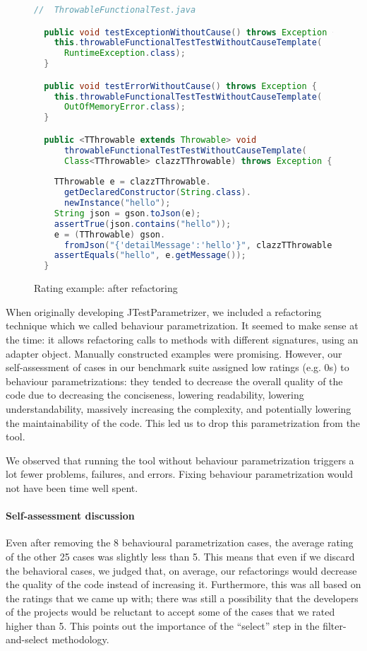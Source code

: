 \begin{figure}
\begin{lstlisting}[language=Java]
  //  ThrowableFunctionalTest.java

  public void testExceptionWithoutCause() throws Exception {
    this.throwableFunctionalTestTestWithoutCauseTemplate(
      RuntimeException.class);
  }

  public void testErrorWithoutCause() throws Exception {
    this.throwableFunctionalTestTestWithoutCauseTemplate(
      OutOfMemoryError.class);
  }

  public <TThrowable extends Throwable> void
      throwableFunctionalTestTestWithoutCauseTemplate(
      Class<TThrowable> clazzTThrowable) throws Exception {
      
    TThrowable e = clazzTThrowable.
      getDeclaredConstructor(String.class).
      newInstance("hello");
    String json = gson.toJson(e);
    assertTrue(json.contains("hello"));
    e = (TThrowable) gson.
      fromJson("{'detailMessage':'hello'}", clazzTThrowable);
    assertEquals("hello", e.getMessage());
  }
\end{lstlisting}
\caption{Rating example: after refactoring}
\label{figure:rating-after}
\end{figure}

When originally developing JTestParametrizer, we included a refactoring technique which we called behaviour parametrization. It seemed to make sense at the time: it allows refactoring calls to methods with different signatures, using an adapter object. Manually constructed examples were promising. However, our self-assessment of cases in our benchmark suite assigned low ratings (e.g. 0s) to behaviour parametrizations: they tended to decrease the overall quality of the code due to decreasing the conciseness, lowering readability, lowering understandability, massively increasing the complexity, and potentially lowering the maintainability of the code. This led us to drop this parametrization from the tool.

We observed that running the tool without behaviour parametrization triggers a lot fewer problems, failures, and errors. Fixing behaviour parametrization would not have been time well spent.


\paragraph{Self-assessment discussion}
Even after removing the 8 behavioural parametrization  cases, the average rating of the other 25 cases was slightly less than 5. This means that even if we discard the behavioral cases, we judged that, on average, our refactorings would decrease the quality of the code instead of increasing it. Furthermore, this was all based on the ratings that we came up with; there was still a possibility that the developers of the projects would be reluctant to accept some of the cases that we rated higher than 5. This points out the importance of the ``select'' step in the filter-and-select methodology.

